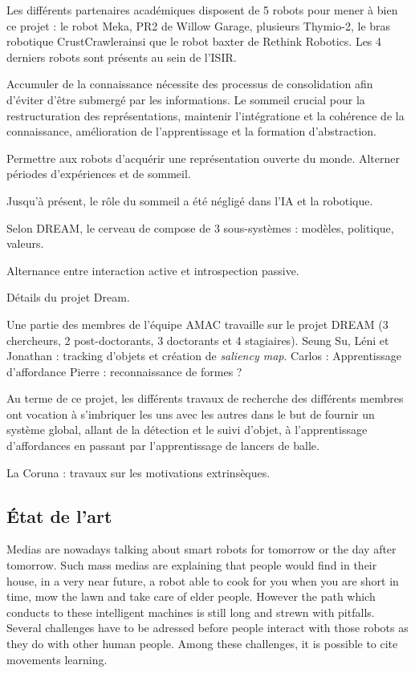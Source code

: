 \documentclass{llncs}
\begin{document}
Les différents partenaires académiques disposent de 5 robots pour mener à bien ce projet : le robot Meka, PR2 de Willow Garage, plusieurs Thymio-2, le bras robotique CrustCrawlerainsi que le robot baxter de Rethink Robotics. Les 4 derniers robots sont présents au sein de l'ISIR.

Accumuler de la connaissance nécessite des processus de consolidation afin d'éviter d'être submergé par les informations. Le sommeil crucial pour la restructuration des représentations, maintenir l'intégratione et la cohérence de la connaissance, amélioration de l'apprentissage et la formation d'abstraction.

Permettre aux robots d'acquérir une représentation ouverte du monde. Alterner périodes d'expériences et de sommeil.

Jusqu'à présent, le rôle du sommeil a été négligé dans l'IA et la robotique.

Selon DREAM, le cerveau de compose de 3 sous-systèmes : modèles, politique, valeurs.

Alternance entre interaction active et introspection passive.

Détails du projet Dream.

Une partie des membres de l'équipe AMAC travaille sur le projet DREAM (3 chercheurs, 2 post-doctorants, 3 doctorants et 4 stagiaires).
Seung Su, Léni et Jonathan : tracking d'objets et création de \textit{saliency map}.
Carlos : Apprentissage d'affordance
Pierre : reconnaissance de formes ?

Au terme de ce projet, les différents travaux de recherche des différents membres ont vocation à s'imbriquer les uns avec les autres dans le but de fournir un système global, allant de la détection et le suivi d'objet, à l'apprentissage d'affordances en passant par l'apprentissage de lancers de balle.

La Coruna : travaux sur les motivations extrinsèques.

\subsection{\'Etat de l'art}

Medias are nowadays talking about smart robots for tomorrow or the day after tomorrow. Such mass medias are explaining that people would find in their house, in a very near future,  a robot able to cook for you when you are short in time, mow the lawn and take care of elder people. However the path which conducts to these intelligent machines is still long and strewn with pitfalls. Several challenges have to be adressed before people interact with those robots as they do with other human people. Among these challenges, it is possible to cite movements learning.
\end{document}
